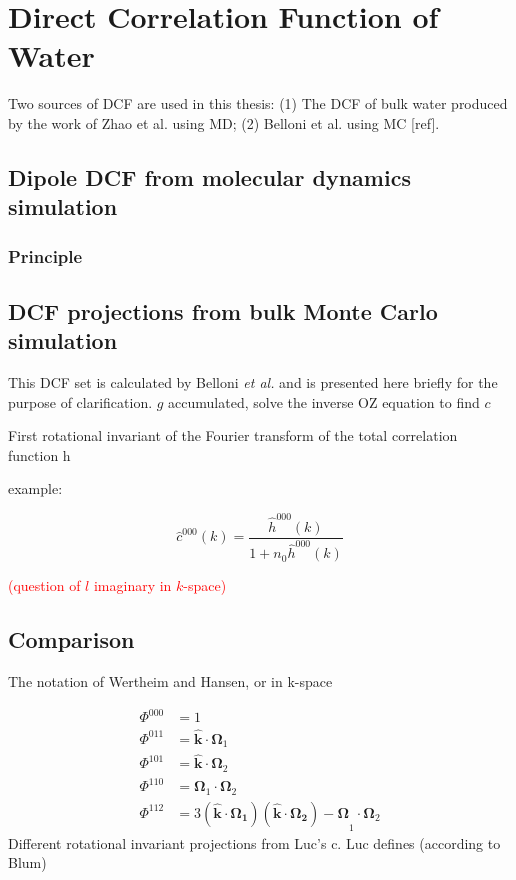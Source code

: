 
\chapter{Direct Correlation Function of Water\label{chpt:dcf-water}}

Two sources of DCF are used in this thesis: (1) The \acs{DCF} of
bulk water produced by the work of Zhao et al. using MD; (2) Belloni
et al. using MC {[}ref{]}.

\section{Dipole DCF from molecular dynamics simulation}

\subsection{Principle}

\section{DCF projections from bulk Monte Carlo simulation}

This DCF set is calculated by Belloni \textit{et al.} \citep{Luc_2012}
and is presented here briefly for the purpose of clarification. $g$
accumulated, solve the inverse OZ equation to find $c$

First rotational invariant of the Fourier transform of the total correlation
function h

example:

\[
\hat{c}^{000}(k)=\frac{\hat{h}^{000}(k)}{1+n_{0}\hat{h}^{000}(k)}
\]

\textcolor{red}{(question of $l$ imaginary in $k$-space)}

\section{Comparison}

The notation of Wertheim and Hansen, or in k-space

\begin{align}
\Phi^{000} & =1\nonumber \\
\Phi^{011} & =\hat{\mathbf{k}}\cdot\mathbf{\Omega}_{1}\nonumber \\
\Phi^{101} & =\hat{\mathbf{k}}\cdot\mathbf{\Omega}_{2}\nonumber \\
\Phi^{110} & =\mathbf{\Omega}_{1}\cdot\mathbf{\Omega}_{2}\\
\Phi^{112} & =3\mathbf{(\hat{\mathbf{k}}\cdot\mathbf{\Omega}_{1})(\hat{\mathbf{k}}\cdot\mathbf{\Omega}_{2})-\Omega}_{1}\cdot\mathbf{\Omega}_{2}\nonumber 
\end{align}
Different rotational invariant projections from Luc’s c. Luc defines
(according to Blum)

